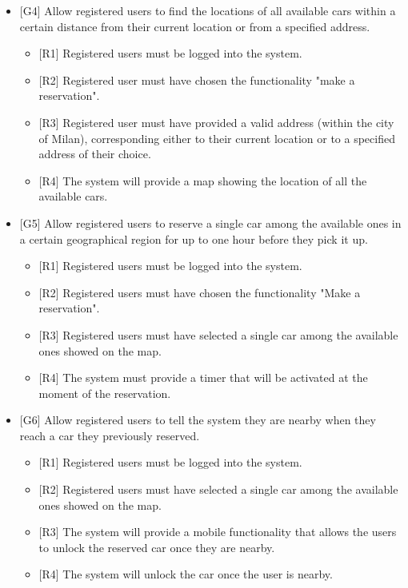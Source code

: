 \begin{itemize}
\begin{itemize}
	\end{itemize}
	\item {[G4]} Allow registered users to find the locations of all available cars within a certain distance from their current location or from a specified address.
	\begin{itemize}
		\item {[R1]} Registered users must be logged into the system.
		\item {[R2]} Registered user must have chosen the functionality "make a reservation".
		\item {[R3]} Registered user must have provided a valid address (within the city of Milan), corresponding either to their current location or to a specified address of their choice. 
		\item {[R4]} The system will provide a map showing the location of all the available cars.
	\end{itemize}
	\item {[G5]} Allow registered users to reserve a single car among the available ones in a certain geographical region for up to one hour before they pick it up.
	\begin{itemize}
		\item {[R1]} Registered users must be logged into the system.
		\item {[R2]} Registered users must have chosen the functionality "Make a reservation".
		\item {[R3]} Registered users must have selected a single car among the available ones showed on the map. 
		\item {[R4]} The system must provide a timer that will be activated at the moment of the reservation.
	\end{itemize}
	\item {[G6]} Allow registered users to tell the system they are nearby when they reach a car they previously reserved.
	\begin{itemize}
		\item {[R1]} Registered users must be logged into the system.
		\item {[R2]} Registered users must have selected a single car among the available ones showed on the map. 
		\item {[R3]} The system will provide a mobile functionality that allows the users to unlock the reserved car once they are nearby.
		\item {[R4]} The system will unlock the car once the user is nearby.
	\end{itemize}

\end{itemize}
